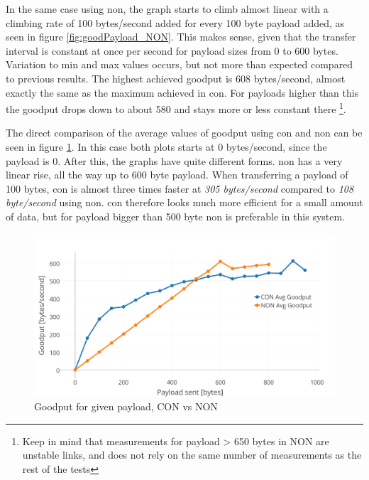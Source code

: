 \noindent In the same case using \gls{non}, the graph starts to climb almost linear with a climbing rate of 100 bytes/second added for every 100 byte payload added, as seen in figure \ref{fig:goodPayload_NON}. This makes sense, given that the transfer interval is constant at once per second for \gls{payload} sizes from 0 to 600 bytes. Variation to min and max values occurs, but not more than expected compared to previous results. The highest achieved \gls{goodput} is 608 bytes/second, almost exactly the same as the maximum achieved in \gls{con}. For \glspl{payload} higher than this the \gls{goodput} drops down to about 580 and stays more or less constant there \footnote{Keep in mind that measurements for payload > 650 bytes in NON are unstable links, and does not rely on the same number of measurements as the rest of the tests}.


\noindent The direct comparison of the average values of \gls{goodput} using \gls{con} and \gls{non} can be seen in figure \ref{fig:payloadGoodput_CONNON}. In this case both plots starts at 0 bytes/second, since the payload is 0. After this, the graphs have quite different forms. \gls{non} has a very linear rise, all the way up to 600 byte payload. When transferring a payload of 100 bytes, \gls{con} is almost three times faster at \textit{305 bytes/second} compared to \textit{108 byte/second} using \gls{non}. \gls{con} therefore looks much more efficient for a small amount of data, but for payload bigger than 500 byte \gls{non} is preferable in this system.

\begin{figure}[ht]
    \centering
    \includegraphics[width=1.0\textwidth]{payloadGoodput_CONNON.png}    
    \caption{Goodput for given payload, CON vs NON}
    \label{fig:payloadGoodput_CONNON}
\end{figure}
 


